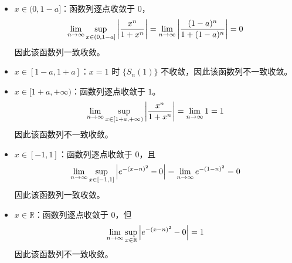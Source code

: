 \begin{problem}
\begin{solution}
        \item[\textbf{7)}]
        \begin{itemize}
            \item $x \in (0, 1 - a]$：函数列逐点收敛于 $0$，
            $$
            \lim_{n \to \infty} \sup_{x \in (0, 1 - a]} \abs{\frac{x^{n}}{1 + x^{n}}} = \lim_{n \to \infty} \abs{\frac{(1 - a)^{n}}{1 + (1 - a)^{n}}} = 0
            $$
            因此该函数列一致收敛。
            \item $x \in [1 - a, 1 + a]$：$x = 1$ 时 $\{S_n(1)\}$ 不收敛，因此该函数列不一致收敛。
            \item $x \in [1 + a, +\infty)$：函数列逐点收敛于 $1$。
            $$
            \lim_{n \to \infty} \sup_{x \in [1 + a, +\infty)} \abs{\frac{x^{n}}{1 + x^{n}}} = \lim_{n \to \infty} 1 = 1
            $$
            因此该函数列不一致收敛。
        \end{itemize}

        \item[\textbf{8)}]
        \begin{itemize}
            \item $x \in [-1, 1]$：函数列逐点收敛于 $0$，且
            $$
            \lim_{n \to \infty} \sup_{x \in [-1, 1]} \abs{e^{-(x - n)^2} - 0} = \lim_{n \to \infty} e^{-(1 - n)^2} = 0
            $$
            因此该函数列一致收敛。
            \item $x \in \mathbb{R}$：函数列逐点收敛于 $0$，但 
            $$
            \lim_{n \to \infty} \sup_{x \in \mathbb{R}} \abs{e^{-(x - n)^2} - 0} = 1
            $$
            因此该函数列不一致收敛。
        \end{itemize}
    \end{solution}
\end{problem}

